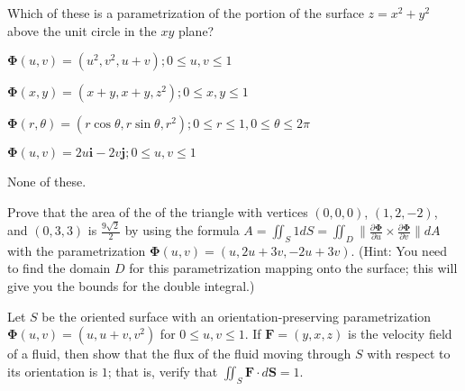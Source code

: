 \documentclass[12pt]{exam}
\newcommand{\vect}[1]{\ensuremath{\mathbf{#1}}}
\newcommand{\<}{(}
\renewcommand{\>}{)}
\newcommand{\p}{\partial}
\begin{document}
\begin{questions}

\question[10]
Which of these is a parametrization of the portion of
the surface \(z=x^2+y^2\) above the unit circle in the \(xy\) plane?
\begin{checkboxes}
\item \(\vect \Phi(u,v)=(u^2,v^2,u+v); 0\leq u,v\leq 1\)
\item \(\vect \Phi(x,y)=(x+y,x+y,z^2); 0\leq x,y\leq 1\)
\item \(
  \vect \Phi(r,\theta)
    =
  (r\cos\theta,r\sin\theta,r^2);
  0\leq r\leq 1,0\leq\theta\leq2\pi
\)
\item \(\vect \Phi(u,v)=2u\vect{i}-2v\vect{j}; 0\leq u,v\leq 1\)
\item None of these.
\end{checkboxes}

\question[10]
Prove that the area of the of the triangle with vertices \((0,0,0)\),
\((1,2,-2)\), and \((0,3,3)\) is \(\frac{9\sqrt 2}{2}\) by using
the formula
\(A=\iint_S1dS=
\iint_D\|\frac{\p\vect\Phi}{\p u}\times\frac{\p\vect\Phi}{\p v}\|dA\)
with the parametrization \(\vect\Phi(u,v)=(u,2u+3v,-2u+3v)\). (Hint:
You need to find the domain \(D\) for this parametrization mapping onto
the surface;
this will give you the bounds for the double integral.)

\newpage

\question[10]
Let \(S\) be the oriented surface with an orientation-preserving parametrization
\(\vect\Phi(u,v)=(u,u+v,v^2)\) for \(0\leq u,v\leq 1\). If
\(\vect F=(y,x,z)\) is the
velocity field of a fluid, then show that the flux of the fluid moving through
\(S\) with respect to its orientation is \(1\); that is, verify that
\(\iint_S\vect F\cdot d\vect S=1\).







\end{questions}
\end{document}
